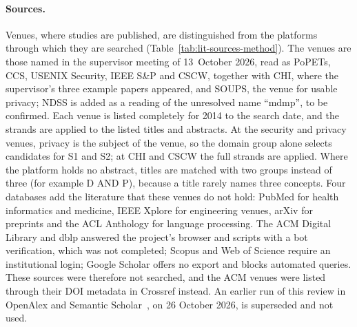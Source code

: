 \paragraph{Sources.} Venues, where studies are published, are distinguished from
the platforms through which they are searched (Table~\ref{tab:lit-sources-method}).
The venues are those named in the supervisor meeting of 13~October 2026, read
as PoPETs, CCS, USENIX Security, IEEE S\&P and CSCW, together with CHI, where
the supervisor's three example papers appeared, and SOUPS, the venue for usable
privacy; NDSS is added as a reading of the unresolved name \enquote{mdmp}, to be
confirmed. Each venue is listed completely for 2014 to the search date, and the
strands are applied to the listed titles and abstracts. At the security and
privacy venues, privacy is the subject of the venue, so the domain group alone
selects candidates for S1 and S2; at CHI and CSCW the full strands are applied.
Where the platform holds no abstract, titles are matched with two groups
instead of three (for example D AND P), because a title rarely names three
concepts. Four databases add the literature that these venues do not hold:
PubMed for health informatics and medicine, IEEE Xplore for engineering
venues, arXiv for preprints and the ACL Anthology for language processing.
The ACM Digital Library and dblp answered the project's browser and scripts with a
bot verification, which was not completed; Scopus and Web of Science require an
institutional login; Google Scholar offers no export and blocks automated
queries. These sources were therefore not searched, and the ACM venues were
listed through their DOI metadata in Crossref instead. An earlier run of this
review in OpenAlex and Semantic
Scholar~\parencite{priem2022openalex,kinney2023semantic}, on 26 October 2026,
is superseded and not used.

